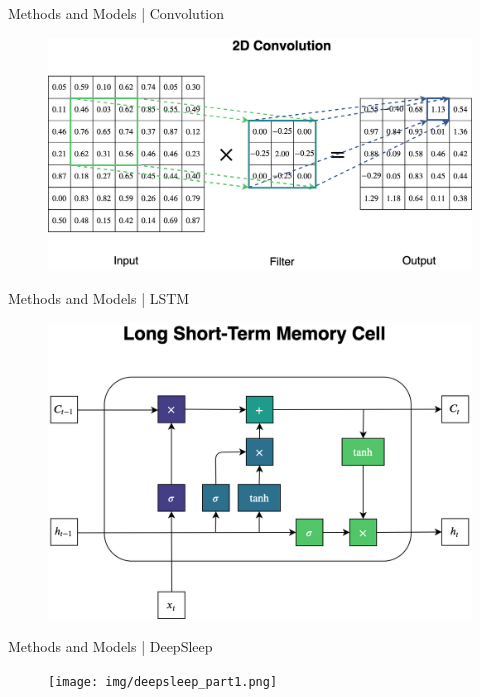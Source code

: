 \documentclass{beamer}
\begin{document}
    \begin{frame}{Methods and Models | Convolution}
        \begin{figure}[hbt]
        	\center
        	\includegraphics[width=1.0\textwidth]{img/convolution.png}
        	\label{fig:convolution}
        \end{figure}
    \end{frame}
    
    \begin{frame}{Methods and Models | LSTM}
        \begin{figure}[hbt]
        	\center
        	\includegraphics[width=1.0\textwidth]{img/LSTM-detailed.png}
        	\label{fig:lstm_detailed}
        \end{figure}
    \end{frame}
    
    \begin{frame}{Methods and Models | DeepSleep}
        \begin{figure}[hbt]
        	\center
        	\texttt{[image: img/deepsleep\_part1.png]}
        	\label{fig:deepsleep}
        \end{figure}
    \end{frame}
    
\end{document}
